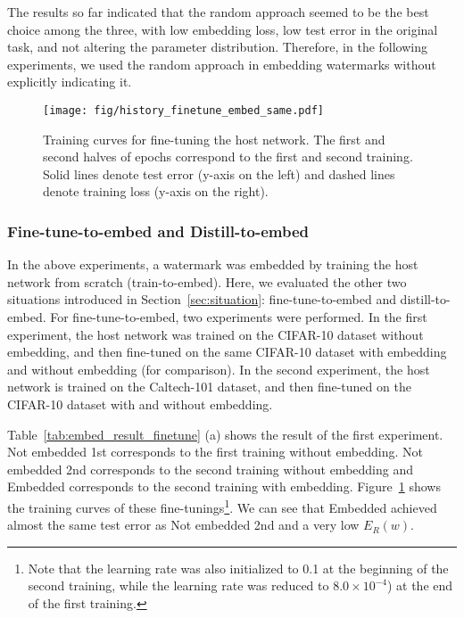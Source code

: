 \documentclass[10pt,twocolumn,letterpaper]{article}
\begin{document}
The results so far indicated that the \textsf{random} approach seemed to be the best choice among the three, with low embedding loss, low test error in the original task, and not altering the parameter distribution.
Therefore, in the following experiments, we used the \textsf{random} approach in embedding watermarks without explicitly indicating it.




\begin{figure}[tb]
	\centering
	\texttt{[image: fig/history\_finetune\_embed\_same.pdf]}
	\caption{Training curves for fine-tuning the host network.
	The first and second halves of epochs correspond to the first and second training.
	Solid lines denote test error (y-axis on the left) and dashed lines denote training loss (y-axis on the right).}
	\label{fig:history_finetune_embed_same}
\end{figure}



\subsubsection{Fine-tune-to-embed and Distill-to-embed}
In the above experiments, a watermark was embedded by training the host network from scratch (train-to-embed).
Here, we evaluated the other two situations introduced in Section~\ref{sec:situation}: fine-tune-to-embed and distill-to-embed.
For fine-tune-to-embed, two experiments were performed.
In the first experiment, the host network was trained on the CIFAR-10 dataset without embedding, and then fine-tuned on the same CIFAR-10 dataset with embedding and without embedding (for comparison).
In the second experiment, the host network is trained on the Caltech-101 dataset, and then fine-tuned on the CIFAR-10 dataset with and without embedding.

Table~\ref{tab:embed_result_finetune} (a) shows the result of the first experiment.
\textsf{Not embedded 1st} corresponds to the first training without embedding.
\textsf{Not embedded 2nd} corresponds to the second training without embedding and \textsf{Embedded} corresponds to the second training with embedding.
Figure~\ref{fig:history_finetune_embed_same} shows the training curves of these fine-tunings\footnote{Note that the learning rate was also initialized to 0.1 at the beginning of the second training, while the learning rate was reduced to $8.0 \times 10^{-4}$) at the end of the first training.}.
We can see that \textsf{Embedded} achieved almost the same test error as \textsf{Not embedded 2nd} and a very low $E_R (w)$.
\end{document}

